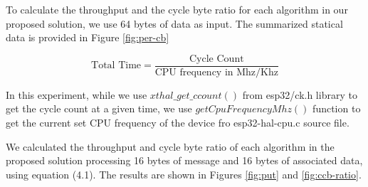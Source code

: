 To calculate the throughput and the cycle byte ratio for each algorithm in our proposed solution, we use 64 bytes of data as input. The summarized statical data is provided in Figure \ref{fig:per-cb}

\begin{equation}
\text{Total Time} = \frac{\text{Cycle Count}}{\text{CPU frequency in Mhz/Khz}}
\end{equation}

In this experiment, while we use \texttt{$xthal\_get\_ccount()$} from esp32/ck.h library to get the cycle count at a given time, we use \texttt{$getCpuFrequencyMhz()$} function to get the current set CPU frequency of the device fro esp32-hal-cpu.c source file.  

We calculated the throughput and cycle byte ratio of each algorithm in the proposed solution processing 16 bytes of message and 16 bytes of associated data, using equation (4.1). The results are shown in Figures \ref{fig:put} and \ref{fig:ccb-ratio}.


